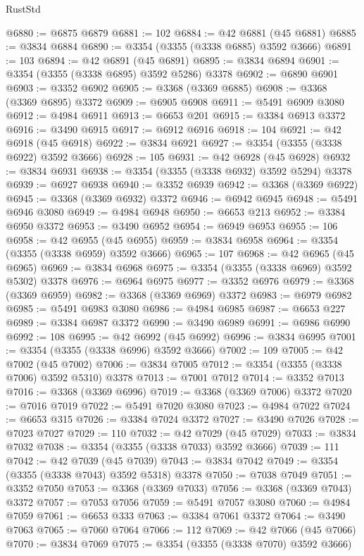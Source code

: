 \begin{lexlean}{RustStd}
\begin{coremodule}
@6880 := @6875 @6879
@6881 := 102
@6884 := @42 @6881 (@45 @6881)
@6885 := @3834 @6884
@6890 := @3354 (@3355 (@3338 @6885) @3592 @3666)
@6891 := 103
@6894 := @42 @6891 (@45 @6891)
@6895 := @3834 @6894
@6901 := @3354 (@3355 (@3338 @6895) @3592 @5286) @3378
@6902 := @6890 @6901
@6903 := @3352 @6902
@6905 := @3368 (@3369 @6885)
@6908 := @3368 (@3369 @6895) @3372
@6909 := @6905 @6908
@6911 := @5491 @6909 @3080
@6912 := @4984 @6911
@6913 := @6653 @201
@6915 := @3384 @6913 @3372
@6916 := @3490 @6915
@6917 := @6912 @6916
@6918 := 104
@6921 := @42 @6918 (@45 @6918)
@6922 := @3834 @6921
@6927 := @3354 (@3355 (@3338 @6922) @3592 @3666)
@6928 := 105
@6931 := @42 @6928 (@45 @6928)
@6932 := @3834 @6931
@6938 := @3354 (@3355 (@3338 @6932) @3592 @5294) @3378
@6939 := @6927 @6938
@6940 := @3352 @6939
@6942 := @3368 (@3369 @6922)
@6945 := @3368 (@3369 @6932) @3372
@6946 := @6942 @6945
@6948 := @5491 @6946 @3080
@6949 := @4984 @6948
@6950 := @6653 @213
@6952 := @3384 @6950 @3372
@6953 := @3490 @6952
@6954 := @6949 @6953
@6955 := 106
@6958 := @42 @6955 (@45 @6955)
@6959 := @3834 @6958
@6964 := @3354 (@3355 (@3338 @6959) @3592 @3666)
@6965 := 107
@6968 := @42 @6965 (@45 @6965)
@6969 := @3834 @6968
@6975 := @3354 (@3355 (@3338 @6969) @3592 @5302) @3378
@6976 := @6964 @6975
@6977 := @3352 @6976
@6979 := @3368 (@3369 @6959)
@6982 := @3368 (@3369 @6969) @3372
@6983 := @6979 @6982
@6985 := @5491 @6983 @3080
@6986 := @4984 @6985
@6987 := @6653 @227
@6989 := @3384 @6987 @3372
@6990 := @3490 @6989
@6991 := @6986 @6990
@6992 := 108
@6995 := @42 @6992 (@45 @6992)
@6996 := @3834 @6995
@7001 := @3354 (@3355 (@3338 @6996) @3592 @3666)
@7002 := 109
@7005 := @42 @7002 (@45 @7002)
@7006 := @3834 @7005
@7012 := @3354 (@3355 (@3338 @7006) @3592 @5310) @3378
@7013 := @7001 @7012
@7014 := @3352 @7013
@7016 := @3368 (@3369 @6996)
@7019 := @3368 (@3369 @7006) @3372
@7020 := @7016 @7019
@7022 := @5491 @7020 @3080
@7023 := @4984 @7022
@7024 := @6653 @315
@7026 := @3384 @7024 @3372
@7027 := @3490 @7026
@7028 := @7023 @7027
@7029 := 110
@7032 := @42 @7029 (@45 @7029)
@7033 := @3834 @7032
@7038 := @3354 (@3355 (@3338 @7033) @3592 @3666)
@7039 := 111
@7042 := @42 @7039 (@45 @7039)
@7043 := @3834 @7042
@7049 := @3354 (@3355 (@3338 @7043) @3592 @5318) @3378
@7050 := @7038 @7049
@7051 := @3352 @7050
@7053 := @3368 (@3369 @7033)
@7056 := @3368 (@3369 @7043) @3372
@7057 := @7053 @7056
@7059 := @5491 @7057 @3080
@7060 := @4984 @7059
@7061 := @6653 @333
@7063 := @3384 @7061 @3372
@7064 := @3490 @7063
@7065 := @7060 @7064
@7066 := 112
@7069 := @42 @7066 (@45 @7066)
@7070 := @3834 @7069
@7075 := @3354 (@3355 (@3338 @7070) @3592 @3666)

\end{coremodule}
\end{lexlean}
